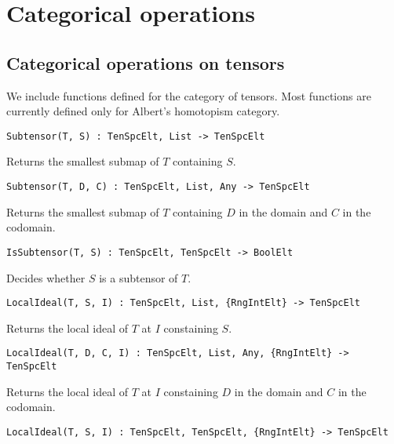 \section{Categorical operations}

\subsection{Categorical operations on tensors}

We include functions defined for the category of tensors.
Most functions are currently defined only for Albert's homotopism category.

\color{blue}
{\small \begin{verbatim}
Subtensor(T, S) : TenSpcElt, List -> TenSpcElt
\end{verbatim} }
\color{black}

Returns the smallest submap of $T$ containing $S$.

\color{blue}
{\small \begin{verbatim}
Subtensor(T, D, C) : TenSpcElt, List, Any -> TenSpcElt
\end{verbatim} }
\color{black}

Returns the smallest submap of $T$ containing $D$ in the domain and $C$ in the 
codomain.

\color{blue}
{\small \begin{verbatim}
IsSubtensor(T, S) : TenSpcElt, TenSpcElt -> BoolElt
\end{verbatim} }
\color{black}

Decides whether $S$ is a subtensor of $T$.

\color{blue}
{\small \begin{verbatim}
LocalIdeal(T, S, I) : TenSpcElt, List, {RngIntElt} -> TenSpcElt
\end{verbatim} }
\color{black}

Returns the local ideal of $T$ at $I$ constaining $S$.

\color{blue}
{\small \begin{verbatim}
LocalIdeal(T, D, C, I) : TenSpcElt, List, Any, {RngIntElt} -> TenSpcElt
\end{verbatim} }
\color{black}

Returns the local ideal of $T$ at $I$ constaining $D$ in the domain and $C$ 
in the codomain.

\color{blue}
{\small \begin{verbatim}
LocalIdeal(T, S, I) : TenSpcElt, TenSpcElt, {RngIntElt} -> TenSpcElt
\end{verbatim} }
\color{black}

